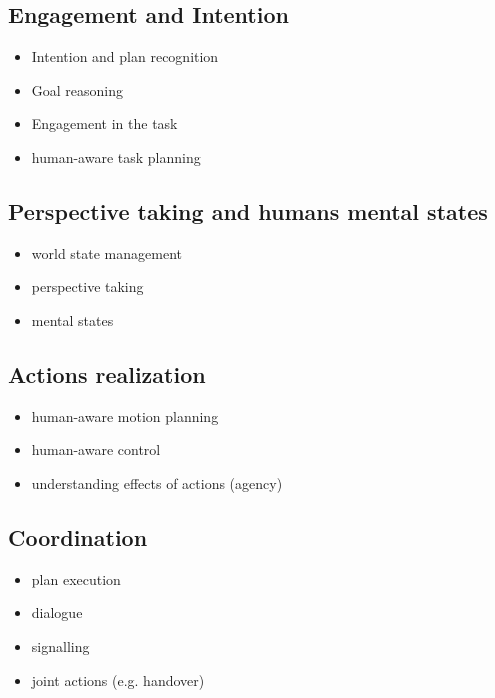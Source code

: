 \documentclass[english,a4paper,11pt,twoside]{StyleThese}
\begin{document}
\subsection{Engagement and Intention}

\label{subsec:engagement}

\begin{itemize}
\item Intention and plan recognition
\item Goal reasoning
\item Engagement in the task
\item human-aware task planning
\end{itemize}

\subsection{Perspective taking and humans mental states}

\label{subsec:perspective_taking}

\begin{itemize}
\item world state management
\item perspective taking
\item mental states
\end{itemize}

\subsection{Actions realization}

\label{subsec:action}

\begin{itemize}
\item human-aware motion planning
\item human-aware control
\item understanding effects of actions (agency)
\end{itemize}


\subsection{Coordination}

\label{subsec:coordination_robot}

\begin{itemize}
\item plan execution
\item dialogue
\item signalling
\item joint actions (e.g. handover)
\end{itemize}
\end{document}
